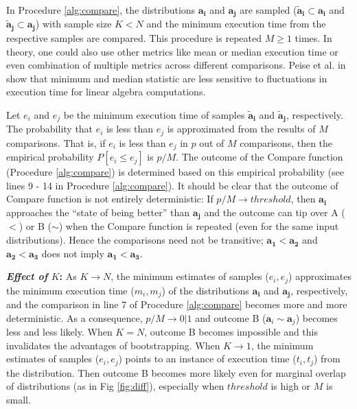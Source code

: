 \documentclass[conference]{IEEEtran}
\begin{document}
In Procedure \ref{alg:compare}, the distributions $\mathbf{a_i}$ and $\mathbf{a_j}$ are sampled ($\mathbf{\tilde{a}_i}
\subset \mathbf{a_i}$ and $\mathbf{\tilde{a}_j} \subset \mathbf{a_j}$) with sample size $K < N$ and the minimum
execution time from the respective samples are compared. This procedure is repeated $M \ge 1$ times.
In theory, one could
also use other metrics like mean or median execution time or even combination of multiple metrics across different
comparisons. Peise et al. in \cite{peisethesis} show that minimum and median statistic are less sensitive to
fluctuations in execution time for linear algebra computations.

Let $e_i$ and $e_j$ be the minimum execution time of samples  $\mathbf{\tilde{a}_i}$ and $\mathbf{\tilde{a}_j}$,
respectively. The probability that $e_i$ is less than $e_j$ is approximated from the results of $M$ comparisons. That
is, if $e_i$ is less than $e_j$ in $p$ out of $M$ comparisons, then the empirical probability $P[e_i \le e_j]$ is
$p/M$. The outcome of the Compare function (Procedure \ref{alg:compare}) is determined based on this empirical
probability (see lines 9 - 14 in Procedure \ref{alg:compare}). It should be clear that the outcome of Compare function is not entirely
deterministic: If $p/M \to threshold$, then  $\mathbf{a_i}$ approaches the ``state of being better'' than $\mathbf{a_j}$ and
the outcome can tip over A ($<$) or B ($\sim$) when the Compare function is repeated (even for the same input distributions). Hence the comparisons need not be transitive;  $\mathbf{a_1} < \mathbf{a_2}$ and
$\mathbf{a_2} < \mathbf{a_3} $ does not imply $\mathbf{a_1} < \mathbf{a_3}$.

\textbf{\textit{Effect of} $K$:} As $K \to N$, the minimum estimates of samples ($e_i, e_j$) approximates the
minimum execution time ($m_i, m_j$) of the distributions $\mathbf{a_i}$ and $\mathbf{a_j}$, respectively, and the
comparison in line 7 of Procedure \ref{alg:compare} becomes more and more deterministic. As a consequence, $p/M \to 0
| 1$ and outcome B
($\mathbf{a}_i \sim \mathbf{a}_j$) becomes less and less likely. When $K=N$,  outcome B becomes impossible and this invalidates the advantages of bootstrapping. When $K \to 1$, the minimum estimates of samples ($e_i, e_j$) points to an instance of execution time ($t_i, t_j$) from the distribution. Then outcome B becomes more likely even for marginal overlap of distributions (as in Fig \ref{fig:diff}), especially when $threshold$ is high or $M$ is small.
\end{document}

